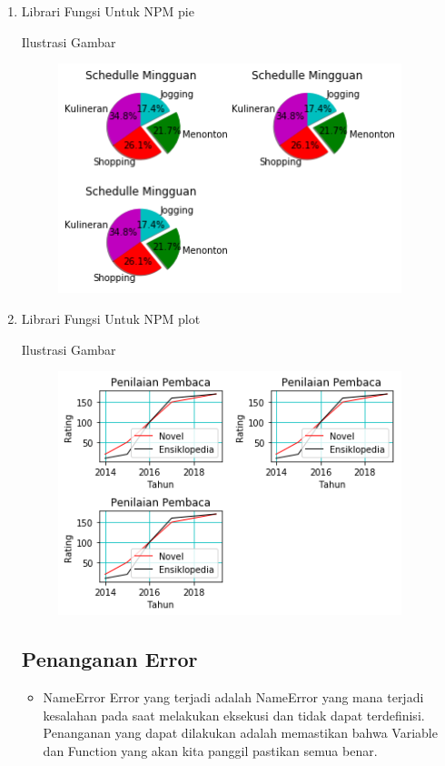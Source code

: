 \begin{enumerate}
\item Librari Fungsi Untuk NPM pie

Ilustrasi Gambar
	\begin{figure}[ht!]
	\includegraphics[width=10cm]{figures/6/1174062/pie.png}
	\centering
	\end{figure}

\item Librari Fungsi Untuk NPM plot

Ilustrasi Gambar
	\begin{figure}[ht!]
	\includegraphics[width=10cm]{figures/6/1174062/plot.png}
	\centering
	\end{figure}

\subsection{Penanganan Error}

\begin{itemize}

\item NameError
Error yang terjadi adalah NameError yang mana terjadi kesalahan pada saat melakukan eksekusi dan tidak dapat terdefinisi.
Penanganan yang dapat dilakukan adalah memastikan bahwa Variable dan Function yang akan kita panggil pastikan semua benar.\\


\end{itemize}
\end{enumerate}
